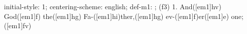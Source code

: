 initial-style: 1;
centering-scheme: english;
def-m1: \grealign;
(f3) 1. And([em1]hv) God([em1]f) the([em1]hg) Fa-([em1]hi)ther,([em1]hg) ev-([em1]f)er([em1]e) one;([em1]fv)